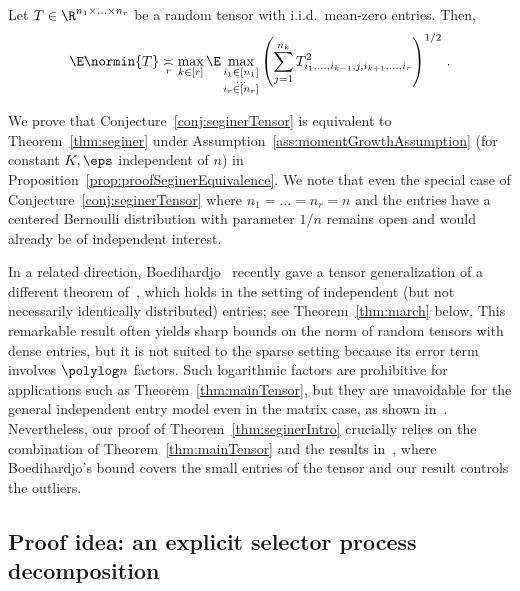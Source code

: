 \documentclass[11pt,a4paper]{article}
\begin{document}
\begin{conjecture}\label{conj:seginerTensor}
    Let $T\in \R^{n_1\times \ldots \times n_r}$ be a random tensor
    with i.i.d.\ mean-zero entries.
    Then,
    \[
        \E \normin{T} \underset{r} \asymp \max_{k\in [r]} \E \max_{\substack{i_1\in [n_1]\\\ldots\\i_{r}\in [n_{r}]}} \left( \sum_{j=1}^{n_k} T^2_{i_1, \ldots, i_{k-1}, j, i_{k+1}, \ldots, i_r}\right)^{1/2}\,.
    \]
\end{conjecture}

We prove that Conjecture~\ref{conj:seginerTensor}
is equivalent to Theorem~\ref{thm:seginer}
under Assumption~\ref{ass:momentGrowthAssumption}
(for constant $K,\eps$ independent of $n$)
in Proposition~\ref{prop:proofSeginerEquivalence}.
We note that even the special case of Conjecture~\ref{conj:seginerTensor} where $n_1 = \ldots = n_r=n$ and the entries have
a centered Bernoulli distribution with parameter $1/n$ remains open
and would already be of independent
interest.

In a related direction, Boedihardjo~\cite{marchTensor} recently gave a tensor
generalization of a different
theorem of~\cite{seginer}, which
holds in the setting of independent (but not
necessarily identically distributed) entries; see
Theorem~\ref{thm:march} below. This remarkable result often yields sharp bounds on the norm of random tensors with dense entries, but it is not suited to the sparse setting because its error term involves $\polylog n$
factors. Such logarithmic factors are prohibitive for applications such
as Theorem~\ref{thm:mainTensor},
but they are unavoidable for the general independent entry model even in the matrix case, as shown in~\cite{seginer}. 
Nevertheless, our proof of Theorem~\ref{thm:seginerIntro} crucially relies on the combination of Theorem~\ref{thm:mainTensor} and the results in~\cite{marchTensor}, where Boedihardjo's bound covers the small entries of the tensor and our result controls the outliers.


\subsection{Proof idea: an explicit selector process decomposition}
\label{sec:overview}
\end{document}
